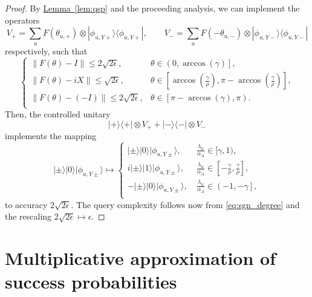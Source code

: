 \documentclass[letterpaper,onecolumn,11pt,accepted=2026-02-14]{quantumarticle}
\newcommand{\norm}[1]{\left\lVert#1\right\rVert}
\theoremstyle{remark}
\theoremstyle{plain}
\newcommand{\eq}[1]{\cref{eq:#1}}
\newcommand{\lem}[1]{\hyperref[lem:#1]{Lemma~\ref*{lem:#1}}}
\newcommand{\ket}[1]{|#1\rangle}
\newcommand{\bra}[1]{\langle#1|}
\newcommand{\ketbra}[2]{\ket{#1}\!\bra{#2}}
\begin{document}
\begin{proof}
By \lem{qsp} and the proceeding analysis, we can implement the operators
\begin{equation}
    V_+=\sum_u F(\theta_{u,+})\otimes\ketbra{\phi_{u,Y+}}{\phi_{u,Y+}},\qquad
    V_-=\sum_u F(-\theta_{u,-})\otimes\ketbra{\phi_{u,Y-}}{\phi_{u,Y-}}
\end{equation}
respectively, such that
\begin{equation}
\begin{cases}
    \norm{F(\theta)-I}\leq2\sqrt{2\epsilon},\quad&\theta\in\left(0,\arccos\left(\gamma\right)\right],\\
    \norm{F(\theta)-iX}\leq\sqrt{2\epsilon},&\theta\in\left[\arccos\left(\frac{\gamma}{\rho}\right),\pi-\arccos\left(\frac{\gamma}{\rho}\right)\right],\\
    \norm{F(\theta)-(-I)}\leq2\sqrt{2\epsilon},&\theta\in\left[\pi-\arccos(\gamma),\pi\right).\\
\end{cases}
\end{equation}
Then, the controlled unitary
\begin{equation}
    \ketbra{+}{+}\otimes V_++\ketbra{-}{-}\otimes V_-
\end{equation}
implements the mapping
\begin{equation}
    \ket{\pm}\ket{0}\ket{\phi_{u,Y\pm}}\mapsto
    \begin{cases}
        \ket{\pm}\ket{0}\ket{\phi_{u,Y\pm}},\quad&\frac{\lambda_u}{\alpha_A}\in[\gamma,1),\\
        i\ket{\pm}\ket{1}\ket{\phi_{u,Y\pm}},&\frac{\lambda_u}{\alpha_A}\in\left[-\frac{\gamma}{\rho},\frac{\gamma}{\rho}\right],\\
        -\ket{\pm}\ket{0}\ket{\phi_{u,Y\pm}},&\frac{\lambda_u}{\alpha_A}\in\left(-1,-\gamma\right],\\
    \end{cases}
\end{equation}
to accuracy $2\sqrt{2\epsilon}$. The query complexity follows now from \eq{sgn_degree} and the rescaling $2\sqrt{2\epsilon}\mapsto\epsilon$.
\end{proof}

\section{Multiplicative approximation of success probabilities}
\label{append:multi}
\end{document}

